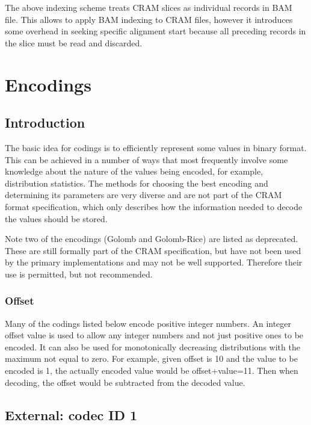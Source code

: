 \documentclass[a4paper]{article}
\begin{document}
The above indexing scheme treats CRAM slices as individual records in BAM file. 
This allows to apply BAM indexing to CRAM files, however it introduces some overhead 
in seeking specific alignment start because all preceding records in the slice 
must be read and discarded.

\section{\textbf{Encodings}}
\label{sec:encodings}


\subsection{\textbf{Introduction}}

The basic idea for codings is to efficiently represent some values in binary format. 
This can be achieved in a number of ways that most frequently involve some knowledge 
about the nature of the values being encoded, for example, distribution statistics. 
The methods for choosing the best encoding and determining its parameters are very 
diverse and are not part of the CRAM format specification, which only describes 
how the information needed to decode the values should be stored.

Note two of the encodings (Golomb and Golomb-Rice) are listed as deprecated.
These are still formally part of the CRAM specification, but have not been used by the primary implementations and may not be well supported.
Therefore their use is permitted, but not recommended.

\subsubsection*{Offset}

Many of the codings listed below encode positive integer numbers. An integer offset 
value is used to allow any integer numbers and not just positive ones to be encoded. 
It can also be used for monotonically decreasing distributions with the maximum 
not equal to zero. For example, given offset is 10 and the value to be encoded 
is 1, the actually encoded value would be offset+value=11. Then when decoding, 
the offset would be subtracted from the decoded value. 

\subsection{External: codec ID 1}
\end{document}
